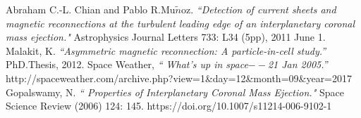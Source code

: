 \documentclass[12pt, a4paper]{article}
\begin{document}
\begin{thebibliography}{9}

 Abraham C.-L. Chian and Pablo R.Mu$\tilde{n}$oz. {\em “Detection of current sheets and magnetic reconnections at the turbulent leading edge of an interplanetary coronal mass ejection." }\/ Astrophysics Journal Letters 733: L34 (5pp), 2011 June 1.
 Malakit, K. {\em “Asymmetric magnetic reconnection: A particle-in-cell study.” }\/ PhD.Thesis, 2012.
 Space Weather, {\em “ What's up in space$--$21 Jan 2005.” }\/\\ http://spaceweather.com/archive.php?view=1\&day=12\&month=09\&year=2017
 Gopalswamy, N. {\em “ Properties of Interplanetary Coronal Mass Ejection."}\/ Space Science Review (2006) 124: 145. https://doi.org/10.1007/s11214-006-9102-1

\end{thebibliography}
\end{document}
